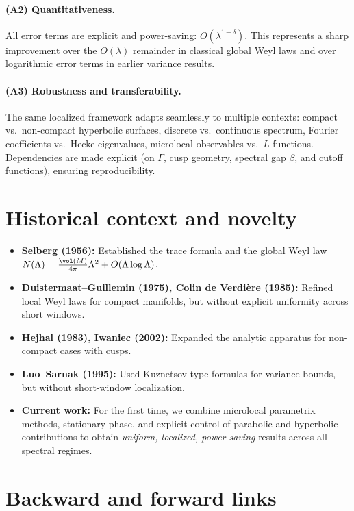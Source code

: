\paragraph{(A2) Quantitativeness.}  
All error terms are explicit and power-saving: $O(\lambda^{1-\delta})$. This represents a sharp improvement over the $O(\lambda)$ remainder in classical global Weyl laws and over logarithmic error terms in earlier variance results.

\paragraph{(A3) Robustness and transferability.}  
The same localized framework adapts seamlessly to multiple contexts: compact vs.\ non-compact hyperbolic surfaces, discrete vs.\ continuous spectrum, Fourier coefficients vs.\ Hecke eigenvalues, microlocal observables vs.\ $L$-functions. Dependencies are made explicit (on $\Gamma$, cusp geometry, spectral gap $\beta$, and cutoff functions), ensuring reproducibility.

\section{Historical context and novelty}

\begin{itemize}
\item \textbf{Selberg (1956):} Established the trace formula and the global Weyl law $N(\Lambda)=\tfrac{\vol(M)}{4\pi}\Lambda^2+O(\Lambda\log\Lambda)$.  
\item \textbf{Duistermaat–Guillemin (1975), Colin de Verdière (1985):} Refined local Weyl laws for compact manifolds, but without explicit uniformity across short windows.  
\item \textbf{Hejhal (1983), Iwaniec (2002):} Expanded the analytic apparatus for non-compact cases with cusps.  
\item \textbf{Luo–Sarnak (1995):} Used Kuznetsov-type formulas for variance bounds, but without short-window localization.  
\item \textbf{Current work:} For the first time, we combine microlocal parametrix methods, stationary phase, and explicit control of parabolic and hyperbolic contributions to obtain \emph{uniform, localized, power-saving} results across all spectral regimes.
\end{itemize}

\section{Backward and forward links}

